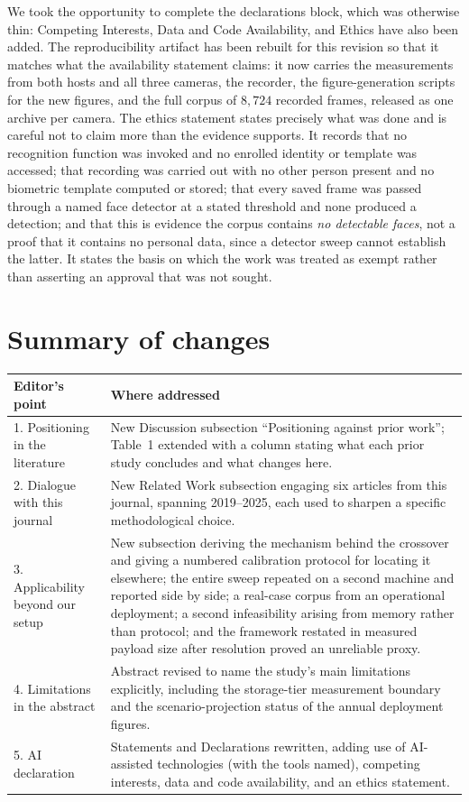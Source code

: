\documentclass[11pt,a4paper]{article}
\begin{document}
We took the opportunity to complete the declarations block, which was otherwise thin: Competing
Interests, Data and Code Availability, and Ethics have also been added. The reproducibility artifact
has been rebuilt for this revision so that it matches what the availability statement claims: it now
carries the measurements from both hosts and all three cameras, the recorder, the figure-generation
scripts for the new figures, and the full corpus of $8{,}724$ recorded frames, released as one archive
per camera. The ethics statement
states precisely what was done and is careful not to claim more than the evidence supports. It records
that no recognition function was invoked and no enrolled identity or template was accessed; that recording
was carried out with no other person present and no biometric template computed or stored; that every saved
frame was passed through a named face detector at a stated threshold and none produced a detection; and
that this is evidence the corpus contains \emph{no detectable faces}, not a proof that it contains no
personal data, since a detector sweep cannot establish the latter. It states the basis on which the work
was treated as exempt rather than asserting an approval that was not sought.

\section*{Summary of changes}

\begin{tabular}{@{}p{}p{}@{}}
\toprule
Editor's point & Where addressed \\
\midrule
1. Positioning in the literature &
New Discussion subsection ``Positioning against prior work''; Table~1 extended with a column stating what each prior study concludes and what changes here. \\[2pt]
2. Dialogue with this journal &
New Related Work subsection engaging six articles from this journal, spanning 2019--2025, each used to sharpen a specific methodological choice. \\[2pt]
3. Applicability beyond our setup &
New subsection deriving the mechanism behind the crossover and giving a numbered calibration protocol for locating it elsewhere; the entire sweep repeated on a second machine and reported side by side; a real-case corpus from an operational deployment; a second infeasibility arising from memory rather than protocol; and the framework restated in measured payload size after resolution proved an unreliable proxy. \\[2pt]
4. Limitations in the abstract &
Abstract revised to name the study's main limitations explicitly, including the storage-tier measurement boundary and the scenario-projection status of the annual deployment figures. \\[2pt]
5. AI declaration &
Statements and Declarations rewritten, adding use of AI-assisted technologies (with the tools named), competing interests, data and code availability, and an ethics statement. \\
\bottomrule
\end{tabular}
\end{document}

